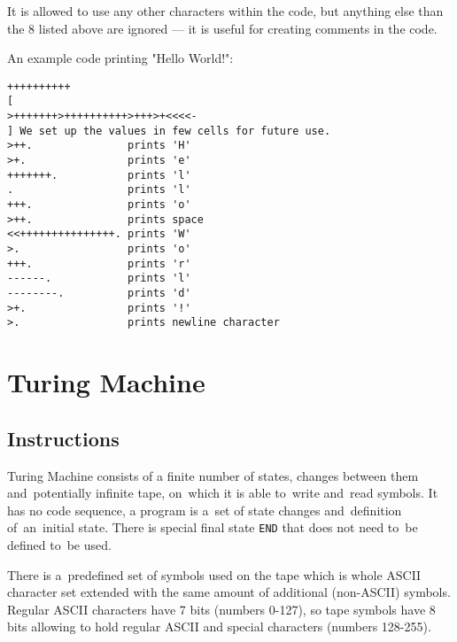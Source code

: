 \documentclass[english,shortabstract,mgr]{iithesis}
\begin{document}
It is allowed to use any other characters within the code, but anything else than the $8$
listed above are ignored --- it is useful for creating comments in the code.

An example code printing "Hello World!":
\begin{verbatim}
++++++++++
[
>+++++++>++++++++++>+++>+<<<<-
] We set up the values in few cells for future use.
>++.               prints 'H'
>+.                prints 'e'
+++++++.           prints 'l'
.                  prints 'l'
+++.               prints 'o'
>++.               prints space
<<+++++++++++++++. prints 'W'
>.                 prints 'o'
+++.               prints 'r'
------.            prints 'l'
--------.          prints 'd'
>+.                prints '!'
>.                 prints newline character
\end{verbatim}

\section {Turing Machine}

\subsection {Instructions}

Turing Machine consists of a finite number of states, changes between them
and~potentially infinite tape, on~which it is able to~write and~read symbols.
It has no code sequence, a program is a~set of state changes and~definition
of~an~initial state. There is special final state \texttt{END} that does not need
        to~be defined to~be used.

There is a~predefined set of symbols used on the tape which is whole ASCII character set
extended with the same amount of additional (non-ASCII) symbols. Regular
ASCII characters have 7 bits (numbers 0-127), so tape symbols have 8 bits
allowing to hold regular ASCII and special characters (numbers 128-255).
\end{document}
